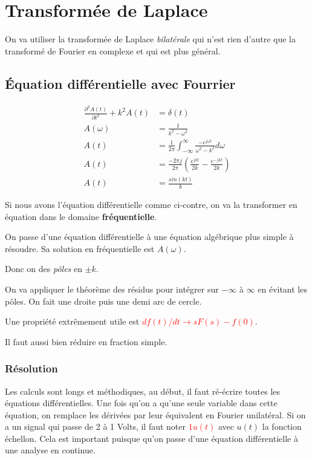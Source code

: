 \documentclass{report}
\begin{document}
\chapter{Transformée de Laplace} \label{Laplace}
On va utiliser la transformée de Laplace \textit{bilatérale} qui n'est rien d'autre que la transformé de Fourier en complexe et qui est plus général.

\section{Équation différentielle avec Fourrier}
\begin{figure}
\centering
\begin{align*}
\frac{\partial^2 A(t)}{\partial t^2} + k^2 A(t) &= \delta (t)\\
A(\omega ) &= \frac{1}{k^2 - \omega^2}\\
A(t) &= \frac{1}{2\pi} \int_{-\infty}^{\infty} \frac{-e^{j \omega t}}{\omega^2 - k^2} d\omega \\
A(t) &= \frac{-2 \pi j}{2\pi} \left( \frac{e^{jkt}}{2k} - \frac{e^{-jkt}}{2k} \right)\\
A(t) &= \frac{sin(kt)}{k}
\end{align*}
\end{figure}
Si nous avons l'équation différentielle comme ci-contre, on va la transformer en équation dans le domaine \textbf{fréquentielle}.\par 
On passe d'une équation différentielle à une équation algébrique plus simple à résoudre. Sa solution en fréquentielle est $A(\omega)$. \par 
Donc on des \textit{pôles} en $\pm k$.\par 
On va appliquer le théorème des résidus pour intégrer sur $- \infty$ à $\infty$ en évitant les pôles. On fait une droite puis une demi arc de cercle.\par 
Une propriété extrêmement utile est \textcolor{red}{$df(t)/dt \rightarrow sF(s) -f(0)$}.\par 
Il faut aussi bien réduire en fraction simple.

\subsection{Résolution}
Les calculs sont longs et méthodiques, au début, il faut ré-écrire toutes les équations différentielles. Une fois qu'on a qu'une seule variable dans cette équation, on remplace les dérivées par leur équivalent en Fourier unilatéral. Si on a un signal qui passe de 2 à 1 Volts, il faut noter \textcolor{red}{$1 u(t)$} avec $u(t)$ la fonction échellon. Cela est important puisque qu'on passe d'une équation différentielle à une analyse en continue.
\end{document}
